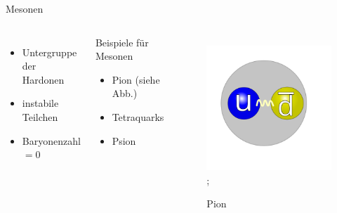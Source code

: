 \documentclass[aspectratio=169,xcolor=dvipsnames]{beamer}
\begin{document}
\begin{frame}{Mesonen}
    \begin{columns}[c]
        \begin{itemize}
            \item Untergruppe der Hardonen
            \item instabile Teilchen
            \item Baryonenzahl $= 0$
        \end{itemize}
        \vspace{20pt}
        \begin{exampleblock}{Beispiele für Mesonen}
            \begin{itemize}
                \item Pion (siehe Abb.) %
                \item Tetraquarks
                \item Psion %
            \end{itemize}
        \end{exampleblock}
        \begin{figure}
            \centering
            \includegraphics[width=0.4\linewidth]{figures/Pion.png}
            ;
            \caption{Pion}
            \label{fig:pion}
        \end{figure}
    \end{columns}
\end{frame}
\end{document}
